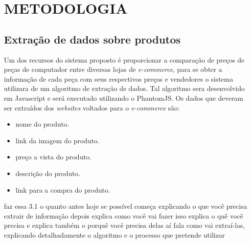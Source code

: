 \section{METODOLOGIA}
\label{sec:metod}

\subsection{Extração de dados sobre produtos}

Um dos recursos do sistema proposto é proporcionar a comparação de preços de peças de computador entre diversas lojas de \emph{e-commerce}, para se obter a informação de cada peça com seus respectivos preços e vendedores o sistema utilizara de um algoritmo de extração de dados. Tal algoritmo sera desenvolvido em Javascript e será executado utilizando o PhantomJS.
Os dados que deveram ser extraídos dos \emph{websites} voltados para o \emph{e-commerce} são:

\begin{itemize}
\setlength{\itemsep}{-0.3ex}
\item nome do produto.
\item link da imagem do produto.
\item preço a vista do produto.
\item descrição do produto.
\item link para a compra do produto.
\end{itemize}





faz essa 3.1 o quanto antes
hoje se possível
começa explicando o que você precisa extrair de informação
depois explica como você vai fazer isso
explica o quê você precisa e explica também o porquê você precisa delas
aí fala como vai extraí-las, explicando detalhadamente o algoritmo e o processo que pretende utilizar
